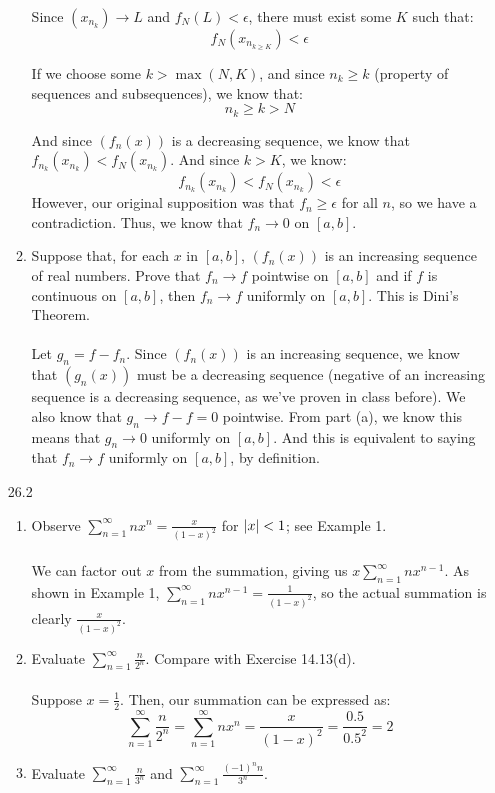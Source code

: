\begin{enumerate}
\begin{enumerate}
        Since $(x_{n_k}) \rightarrow L$ and $f_N(L) < \epsilon$, there must exist some $K$ such that:
        $$f_N(x_{n_{k \geq K}}) < \epsilon$$

        If we choose some $k > \max (N,K)$, and since $n_k \geq k$ (property of sequences and subsequences), we know that:
        $$n_k \geq k > N$$

        And since $(f_n(x))$ is a decreasing sequence, we know that $f_{n_k}(x_{n_k}) < f_N(x_{n_k})$. And since $k > K$, we know:
        $$f_{n_k}(x_{n_k}) < f_N(x_{n_k}) < \epsilon$$
        However, our original supposition was that $f_n \geq \epsilon$ for all $n$, so we have a contradiction. Thus, we know that $f_n \rightarrow 0$ on $[a,b]$.                

      \item Suppose that, for each $x$ in $[a,b]$, $(f_n(x))$ is an increasing sequence of real numbers. Prove that $f_n \rightarrow f$ pointwise on $[a,b]$ and if $f$ is continuous on $[a,b]$, then $f_n \rightarrow f$ uniformly on $[a,b]$. This is Dini's Theorem.\\\\

        Let $g_n = f - f_n$. Since $(f_n(x))$ is an increasing sequence, we know that $(g_n(x))$ must be a decreasing sequence (negative of an increasing sequence is a decreasing sequence, as we've proven in class before). We also know that $g_n \rightarrow f - f = 0$ pointwise. From part (a), we know this means that $g_n \rightarrow 0$ uniformly on $[a,b]$. And this is equivalent to saying that $f_n \rightarrow f$ uniformly on $[a,b]$, by definition.
    \end{enumerate}
  \item [26.2]
    \begin{enumerate}
      \item Observe $\sum_{n=1}^\infty nx^n = \frac{x}{(1-x)^2}$ for $\left\vert x \right\vert < 1$; see Example 1.\\\\

        We can factor out $x$ from the summation, giving us $x \sum_{n=1}^\infty nx^{n-1}$. As shown in Example 1, $\sum_{n=1}^\infty nx^{n-1} = \frac{1}{(1-x)^2}$, so the actual summation is clearly $\frac{x}{(1-x)^2}$.
      \item Evaluate $\sum_{n=1}^\infty \frac{n}{2^n}$. Compare with Exercise 14.13(d).\\\\

        Suppose $x = \frac{1}{2}$. Then, our summation can be expressed as:
        $$\sum_{n=1}^\infty \frac{n}{2^n} = \sum_{n=1}^\infty nx^n = \frac{x}{(1-x)^2} = \frac{0.5}{0.5^2} = 2$$
      \item Evaluate $\sum_{n=1}^\infty \frac{n}{3^n}$ and $\sum_{n=1}^\infty \frac{(-1)^n n}{3^n}$.\\\\


\end{enumerate}
\end{enumerate}
